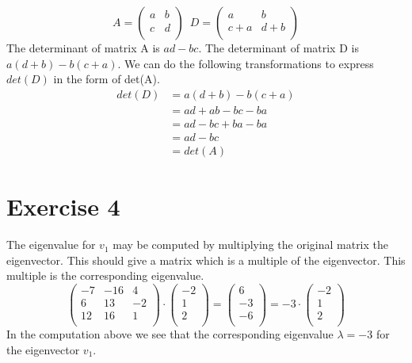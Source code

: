 \documentclass[a4paper]{article}
\begin{document}
\begin{enumerate}
\[
A =
\left(
\begin{array}{cc}
a & b \\
c & d \\
\end{array}
\right)
\enspace
D =
\left(
\begin{array}{cc}
a & b \\
c + a & d + b \\
\end{array}
\right)
\]
The determinant of matrix A is $ad - bc$. The determinant of matrix D is $a(d + b) - b(c + a)$. We can do the following transformations to express $det(D)$ in the form of det(A).
\begin{align*}
  det(D) &=
  a(d + b) - b(c + a) \\ &= ad + ab - bc - ba \\
  &= ad - bc + ba - ba \\
  &= ad - bc \\
  &= det(A)
\end{align*}

\end{enumerate}

\section*{Exercise 4}
The eigenvalue for $v_1$ may be computed by multiplying the original matrix the eigenvector. This should give a matrix which is a multiple of the eigenvector. This multiple is the corresponding eigenvalue.
\[
\left(
\begin{array}{rrr}
-7 & -16 & 4 \\
6 & 13 & -2 \\
12 & 16 & 1 \\
\end{array}
\right)
\cdot
\left(
\begin{array}{r}
-2 \\
1 \\
2 \\
\end{array}
\right)
=
\left(
\begin{array}{r}
6 \\
-3 \\
-6 \\
\end{array}
\right)
=
-3 \cdot
\left(
\begin{array}{r}
-2 \\
1 \\
2 \\
\end{array}
\right)
\]
In the computation above we see that the corresponding eigenvalue $\lambda = -3$ for the eigenvector $v_1$.
\end{document}
